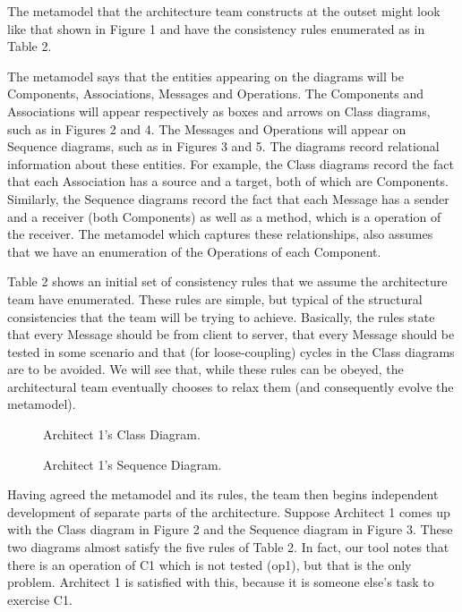 \documentclass[times, 10pt,twocolumn]{article}
\begin{document}
The metamodel that the architecture team constructs at the outset might look like that shown in Figure 1 and have the consistency rules enumerated as in Table 2.

The metamodel says that the entities appearing on the diagrams will be Components, Associations, Messages and Operations. The Components and Associations will appear respectively as boxes and arrows on Class diagrams, such as in Figures 2 and 4. The Messages and Operations will appear on Sequence diagrams, such as in Figures 3 and 5. The diagrams record relational information about these entities. For example, the Class diagrams record the fact that each Association has a source and a target, both of which are Components. Similarly, the Sequence diagrams record the fact that each Message has a sender and a receiver (both Components) as well as a method, which is a operation of the receiver. The metamodel which captures these relationships, also assumes that we have an enumeration of the Operations of each Component.


Table 2 shows an initial set of consistency rules that we assume the architecture team have enumerated. These rules are simple, but typical of the structural consistencies that the team will be trying to achieve. Basically, the rules state that every Message should be from client to server, that every Message should be tested in some scenario and that (for loose-coupling) cycles in the Class diagrams are to be avoided. We will see that, while these rules can be obeyed, the architectural team eventually chooses to relax them (and consequently evolve the metamodel).


\begin{figure}
  \centering
   {}
   \caption{Architect 1's Class Diagram.}
\end{figure}

\begin{figure}
  \centering
   {}
   \caption{Architect 1's Sequence Diagram.}
\end{figure}



\noindent Having agreed the metamodel and its rules, the team then begins independent development of separate parts of the architecture. Suppose Architect 1 comes up with the Class diagram in Figure 2 and the Sequence diagram in Figure 3. These two diagrams almost satisfy the five rules of Table 2. In fact, our tool notes that there is an operation of C1 which is not tested (op1), but that is the only problem. Architect 1 is satisfied with this, because it is someone else's task to exercise C1. 
\end{document}
